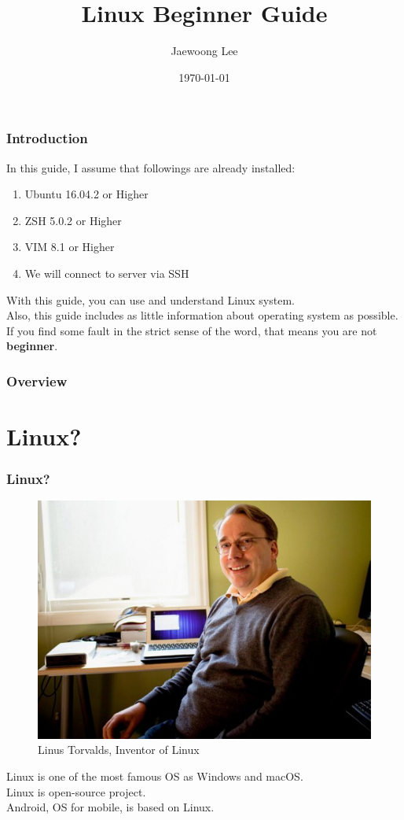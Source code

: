 \documentclass{beamer}
\title{Linux Beginner Guide}
\author{Jaewoong Lee}
\institute[UNIST]
{
	Ulsan National Institute of Science and Technology
	\medskip
	\newline
	\textit{jwlee230@unist.ac.kr}
}
\date{\today}
\begin{document}
	\begin{frame}
		\titlepage
	\end{frame}

	\begin{frame}
		\frametitle{Introduction}
		
		In this guide, I assume that followings are already installed:
		\begin{enumerate}
			\item Ubuntu 16.04.2 or Higher
			\item ZSH 5.0.2 or Higher
			\item VIM 8.1 or Higher
			\item We will connect to server via SSH
		\end{enumerate}

		With this guide, you can use and understand Linux system. \\
		Also, this guide includes as little information about operating system as possible. If you find some fault in the strict sense of the word, that means you are not \textbf{beginner}. 
	\end{frame}

	\begin{frame}
		\frametitle{Overview}
		\tableofcontents
	\end{frame}

	\section{Linux?}
	
	\begin{frame}
		\frametitle{Linux?}
		\begin{figure}[h!]
			\centering
			\includegraphics[width=0.4 \linewidth]{figures/linus.jpg}
			\caption{Linus Torvalds, Inventor of Linux}
		\end{figure}
	
		Linux is one of the most famous OS as Windows and macOS. \\
		Linux is open-source project. \\
		Android, OS for mobile, is based on Linux. 
	\end{frame}
\end{document}
